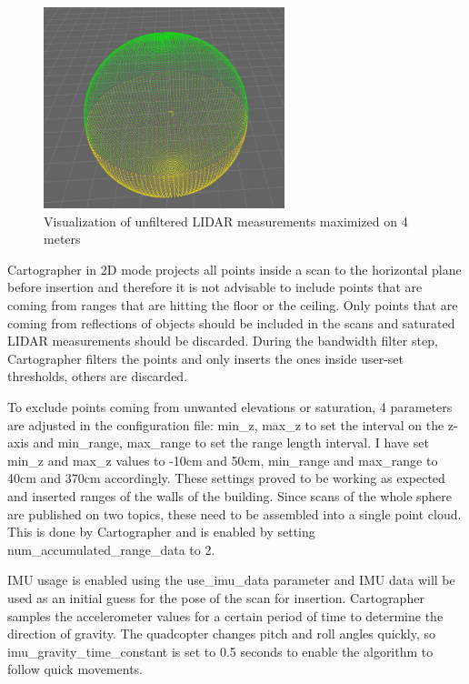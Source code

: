 \begin{figure}[!h]
    \centering
	\includegraphics[width=70mm, keepaspectratio]{figures/01_maxed_lidar.png}
    \caption{Visualization of unfiltered LIDAR measurements maximized on 4 meters}
    \label{fig:01_maxed_lidar}
\end{figure}

Cartographer in 2D mode projects all points inside a scan to the horizontal plane before
insertion and therefore it is not advisable to include points that are coming from ranges
that are hitting the floor or the ceiling. Only points that are coming from reflections
of objects should be included in the scans and saturated LIDAR measurements should be
discarded. During the bandwidth filter step, Cartographer filters the points and only
inserts the ones inside user-set thresholds, others are discarded.

To exclude points coming from unwanted elevations or saturation, 4 parameters are
adjusted in the configuration file: min\_z, max\_z to set the interval on the z-axis
and min\_range, max\_range to set the range length interval. I have set min\_z and
max\_z values to -10cm and 50cm, min\_range and max\_range to 40cm and 370cm accordingly.
These settings proved to be working as expected and inserted ranges of the walls of
the building. Since scans of the whole sphere are published on two topics, these need to be
assembled into a single point cloud. This is done by Cartographer and is enabled by
setting num\_accumulated\_range\_data to 2.

IMU usage is enabled using the use\_imu\_data parameter and IMU data will be used as an
initial guess for the pose of the scan for insertion. Cartographer samples the
accelerometer values for a certain period of time to determine the direction of gravity.
The quadcopter changes pitch and roll angles quickly, so imu\_gravity\_time\_constant is
set to 0.5 seconds to enable the algorithm to follow quick movements.


